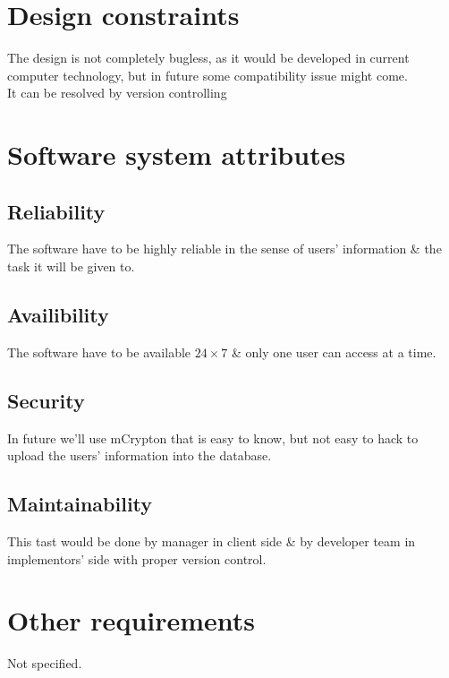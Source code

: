 \section{Design constraints}
The design is not completely bugless, as it would be developed in current computer technology, but in future some compatibility issue might come.
\\It can be resolved by version controlling

\section{Software system attributes}
\subsection{Reliability}
The software have to be highly reliable in the sense of users' information \& the task it will be given to.
\subsection{Availibility}
The software have to be available $24\times 7$ \& only one user can access at a time.
\subsection{Security}
In future we'll use mCrypton that is easy to know, but not easy to hack to upload the users' information into the database.
\subsection{Maintainability}
This tast would be done by manager in client side \& by developer team in implementors' side with proper version control.
\section{Other requirements}
Not specified.
